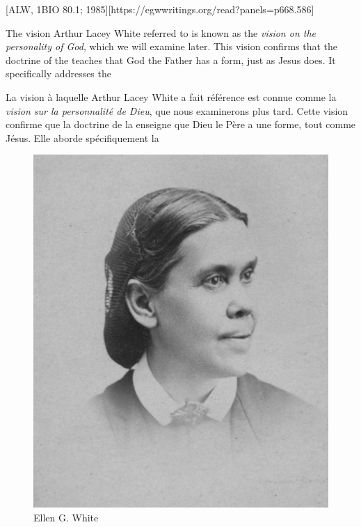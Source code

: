 [ALW, 1BIO 80.1; 1985][https://egwwritings.org/read?panels=p668.586]


The vision Arthur Lacey White referred to is known as the \textit{vision on the personality of God}, which we will examine later. This vision confirms that the doctrine of the  teaches that God the Father has a form, just as Jesus does. It specifically addresses the 


La vision à laquelle Arthur Lacey White a fait référence est connue comme la \textit{vision sur la personnalité de Dieu}, que nous examinerons plus tard. Cette vision confirme que la doctrine de la  enseigne que Dieu le Père a une forme, tout comme Jésus. Elle aborde spécifiquement la 


\begin{figure}[t]
    \centering
    \includegraphics[width=0.65\linewidth]{images/ellen-white.jpg}
    \caption*{Ellen G. White}
    \label{fig:ellen-g-white}
\end{figure}


